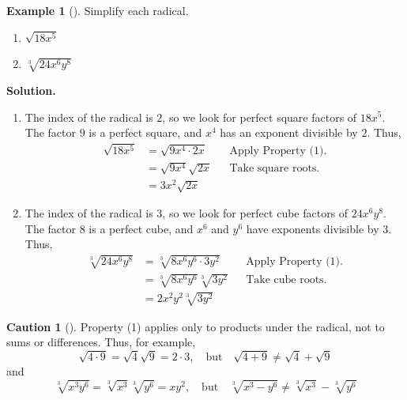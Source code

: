\documentclass[10pt,]{book}
\theoremstyle{plain}
\theoremstyle{definition}
\newtheorem{warning}[theorem]{Caution}
\theoremstyle{definition}
\newtheorem{example}[theorem]{Example}
\theoremstyle{definition}
\numberwithin{equation}{part}
\newcommand{\amp}{&}
\begin{document}
\begin{example}[]\label{example-70}
Simplify each radical. \leavevmode%
\begin{enumerate}[label=*\alph**]
\item\hypertarget{li-336}{}\(\sqrt{18x^5}\)%
\item\hypertarget{li-337}{}\(\sqrt[3]{24x^6y^8} \)%
\end{enumerate}
%
\par\medskip\noindent%
\textbf{Solution.}\quad \leavevmode%
\begin{enumerate}[label=*\alph**]
\item\hypertarget{li-338}{}The index of the radical is \(2\), so we look for perfect square factors of \(18x^5\). The factor \(9\) is a perfect square, and \(x^4\) has an exponent divisible by \(2\). Thus,%
\begin{align*}
\sqrt{18x^5} \amp = \sqrt{9x^4\cdot 2x}\amp\amp\text{Apply Property (1).}
\\
\amp = \sqrt{9x^4} \sqrt{2x}\amp\amp\text{Take square roots.}
\\
\amp = 3x^2\sqrt{2x}
\end{align*}
%
\item\hypertarget{li-339}{}The index of the radical is \(3\), so we look for perfect cube factors of \(24x^6 y^8\). The factor \(8\) is a perfect cube, and \(x^6\) and \(y^6\) have exponents divisible by \(3\). Thus,%
\begin{align*}
\sqrt[3]{24x^6y^8} \amp = \sqrt[3]{8x^6 y^6 \cdot 3 y^2}\amp\amp\text{Apply Property (1).}
\\
\amp = \sqrt[3]{8x^6 y^6} \sqrt[3]{3 y^2}\amp\amp\text{Take cube roots.}
\\
\amp = 2x^2 y^2\sqrt[3]{3y^2}
\end{align*}
%
\end{enumerate}
%
\end{example}
\begin{warning}[]\label{warning-14}
Property (1) applies only to products under the radical, not to sums or differences. Thus, for example,%
\begin{equation*}
\sqrt{4\cdot 9}=\sqrt{4}\sqrt{9}=2\cdot 3, ~~~\text{ but }~~~\sqrt{4+ 9}\ne \sqrt{4}+\sqrt{9}
\end{equation*}
and%
\begin{equation*}
\sqrt[3]{x^3y^6}=\sqrt[3]{x^3}\sqrt[3]{y^6}=xy^2, ~~~\text{ but }~~~\sqrt[3]{x^3-y^6}\ne \sqrt[3]{x^3}-\sqrt[3]{y^6}
\end{equation*}
%
\end{warning}
\end{document}
